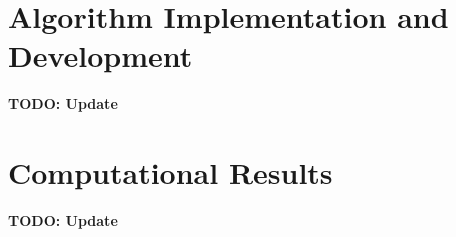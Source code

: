 \documentclass[11pt]{amsart}
\begin{document}
\section{Algorithm Implementation and Development}\label{sec:algorithms}
\textbf{TODO: Update}




\section{Computational Results}\label{sec:results}

\textbf{TODO: Update}

\end{document}
